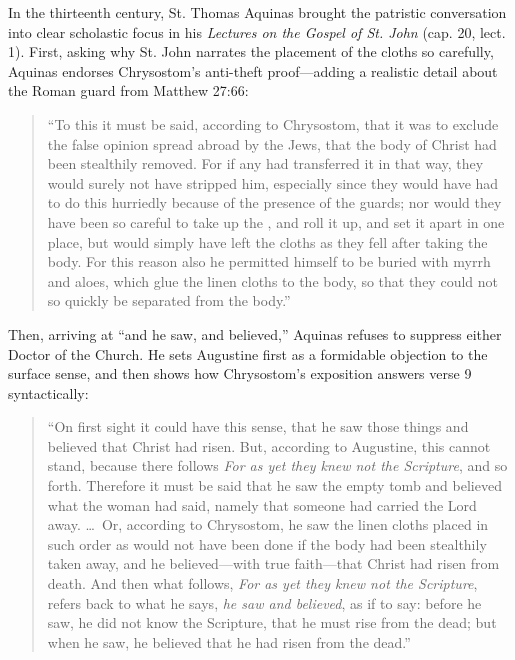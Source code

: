 In the thirteenth century, St. Thomas Aquinas brought the patristic conversation into clear scholastic focus in his \emph{Lectures on the Gospel of St. John} (cap. 20, lect. 1). First, asking why St. John narrates the placement of the cloths so carefully, Aquinas endorses Chrysostom's anti-theft proof---adding a realistic detail about the Roman guard from Matthew 27:66:
\begin{quote}
``To this it must be said, according to Chrysostom, that it was to exclude the false opinion spread abroad by the Jews, that the body of Christ had been stealthily removed. For if any had transferred it in that way, they would surely not have stripped him, especially since they would have had to do this hurriedly because of the presence of the guards; nor would they have been so careful to take up the , and roll it up, and set it apart in one place, but would simply have left the cloths as they fell after taking the body. For this reason also he permitted himself to be buried with myrrh and aloes, which glue the linen cloths to the body, so that they could not so quickly be separated from the body.''
\end{quote}

Then, arriving at ``and he saw, and believed,'' Aquinas refuses to suppress either Doctor of the Church. He sets Augustine first as a formidable objection to the surface sense, and then shows how Chrysostom's exposition answers verse 9 syntactically:
\begin{quote}
``On first sight it could have this sense, that he saw those things and believed that Christ had risen. But, according to Augustine, this cannot stand, because there follows \emph{For as yet they knew not the Scripture}, and so forth. Therefore it must be said that he saw the empty tomb and believed what the woman had said, namely that someone had carried the Lord away. \dots\ Or, according to Chrysostom, he saw the linen cloths placed in such order as would not have been done if the body had been stealthily taken away, and he believed---with true faith---that Christ had risen from death. And then what follows, \emph{For as yet they knew not the Scripture}, refers back to what he says, \emph{he saw and believed}, as if to say: before he saw, he did not know the Scripture, that he must rise from the dead; but when he saw, he believed that he had risen from the dead.''
\end{quote}

